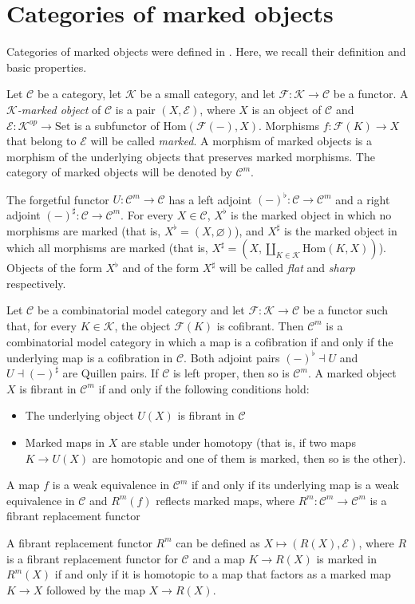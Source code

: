 \documentclass[reqno]{amsart}
\theoremstyle{definition}
\theoremstyle{remark}
\newcommand{\fs}[1]{\mathrm{#1}}
\newcommand{\Hom}{\fs{Hom}}
\newcommand{\cat}[1]{\mathcal{#1}}
\newcommand{\C}{\cat{C}}
\newcommand{\K}{\cat{K}}
\newcommand{\Set}{\fs{Set}}
\numberwithin{figure}{section}
\begin{document}
\section{Categories of marked objects}

Categories of marked objects were defined in \cite{marked-obj}.
Here, we recall their definition and basic properties.

\begin{defn}
Let $\C$ be a category, let $\mathcal{K}$ be a small category, and let $\mathcal{F} : \mathcal{K} \to \C$ be a functor.
A \emph{$\K$-marked object} of $\C$ is a pair $(X,\mathcal{E})$, where $X$ is an object of $\C$ and $\mathcal{E} : \mathcal{K}^{op} \to \Set$ is a subfunctor of $\Hom(\mathcal{F}(-),X)$.
Morphisms $f : \mathcal{F}(K) \to X$ that belong to $\mathcal{E}$ will be called \emph{marked}.
A morphism of marked objects is a morphism of the underlying objects that preserves marked morphisms.
The category of marked objects will be denoted by $\C^m$.
\end{defn}

The forgetful functor $U : \C^m \to \C$ has a left adjoint $(-)^\flat : \C \to \C^m$ and a right adjoint $(-)^\sharp : \C \to \C^m$.
For every $X \in \C$, $X^\flat$ is the marked object in which no morphisms are marked (that is, $X^\flat = (X,\varnothing)$),
and $X^\sharp$ is the marked object in which all morphisms are marked (that is, $X^\sharp = (X,\coprod_{K \in \mathcal{K}} \Hom(K,X))$).
Objects of the form $X^\flat$ and of the form $X^\sharp$ will be called \emph{flat} and \emph{sharp} respectively.

\begin{thm}
Let $\C$ be a combinatorial model category and let $\mathcal{F} : \mathcal{K} \to \C$ be a functor such that, for every $K \in \mathcal{K}$, the object $\mathcal{F}(K)$ is cofibrant.
Then $\C^m$ is a combinatorial model category in which a map is a cofibration if and only if the underlying map is a cofibration in $\C$.
Both adjoint pairs $(-)^\flat \dashv U$ and $U \dashv (-)^\sharp$ are Quillen pairs.
If $\C$ is left proper, then so is $\C^m$.
A marked object $X$ is fibrant in $\C^m$ if and only if the following conditions hold:
\begin{itemize}
\item The underlying object $U(X)$ is fibrant in $\C$
\item Marked maps in $X$ are stable under homotopy (that is, if two maps $K \to U(X)$ are homotopic and one of them is marked, then so is the other).
\end{itemize}
A map $f$ is a weak equivalence in $\C^m$ if and only if its underlying map is a weak equivalence in $\C$ and $R^m(f)$ reflects marked maps, where $R^m : \C^m \to \C^m$ is a fibrant replacement functor

A fibrant replacement functor $R^m$ can be defined as $X \mapsto (R(X),\mathcal{E})$,
where $R$ is a fibrant replacement functor for $\C$ and a map $K \to R(X)$ is marked in $R^m(X)$ if and only if
it is homotopic to a map that factors as a marked map $K \to X$ followed by the map $X \to R(X)$.
\end{thm}
\end{document}
